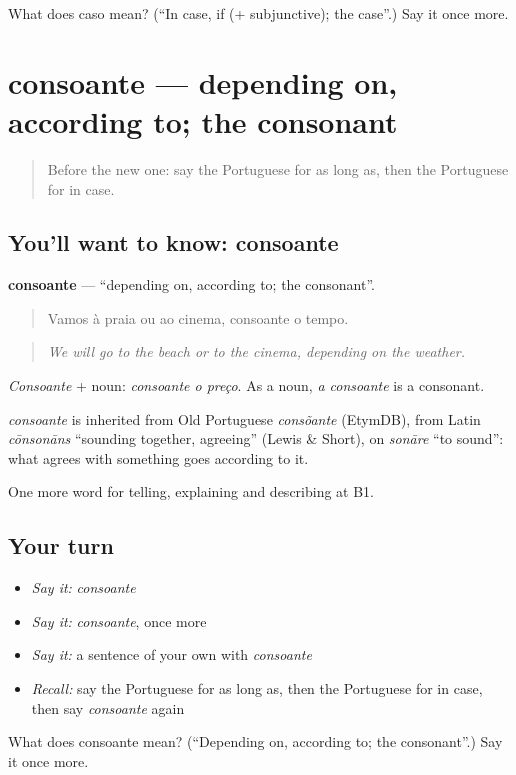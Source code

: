 \begin{tcolorbox}[breakable,colback=teal!4,colframe=teal!35!black,title={Before you move on}]
What does caso mean? (\textquotedblleft{}In case, if (+ subjunctive); the case\textquotedblright{}.) Say it once more.
\end{tcolorbox}
\section[consoante]{consoante — depending on, according to; the consonant}

\label{lesson:PT-C369-consoante}



\begin{quote}
Before the new one: say the Portuguese for as long as, then the Portuguese for in case.
\end{quote}

\subsection*{You'll want to know: consoante}
\textbf{consoante} — \textquotedblleft{}depending on, according to; the consonant\textquotedblright{}.

\begin{quote}
Vamos à praia ou ao cinema, consoante o tempo.
\end{quote}

\begin{quote}
\emph{We will go to the beach or to the cinema, depending on the weather.}
\end{quote}

\emph{Consoante} + noun: \emph{consoante o preço}. As a noun, \emph{a consoante} is a consonant.

\begin{cousinweb}
\emph{consoante} is inherited from Old Portuguese \emph{consõante} (EtymDB), from Latin \emph{cōnsonāns} \textquotedblleft{}sounding together, agreeing\textquotedblright{} (Lewis \& Short), on \emph{sonāre} \textquotedblleft{}to sound\textquotedblright{}: what agrees with something goes according to it.
\end{cousinweb}

\begin{grammarlens}[title={What you've built}]
One more word for telling, explaining and describing at B1.
\end{grammarlens}

\subsection*{Your turn}
\begin{itemize}
\raggedright
  \item \emph{Say it:} \emph{consoante}
  \item \emph{Say it:} \emph{consoante}, once more
  \item \emph{Say it:} a sentence of your own with \emph{consoante}
  \item \emph{Recall:} say the Portuguese for as long as, then the Portuguese for in case, then say \emph{consoante} again
\end{itemize}

\begin{tcolorbox}[breakable,colback=teal!4,colframe=teal!35!black,title={Before you move on}]
What does consoante mean? (\textquotedblleft{}Depending on, according to; the consonant\textquotedblright{}.) Say it once more.
\end{tcolorbox}
